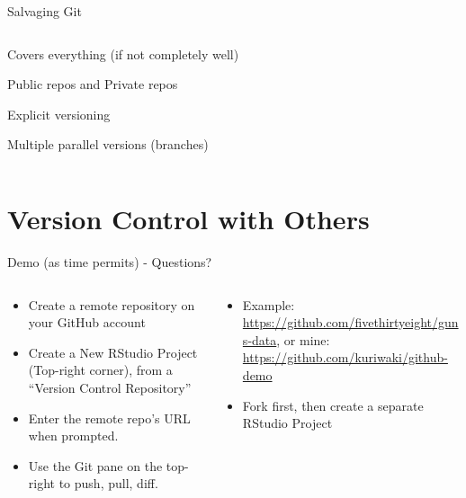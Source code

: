 \documentclass[ignorenonframetext, 10pt, aspectratio=169]{beamer}
\begin{document}
\begin{frame}{Salvaging Git}
\begin{columns}[T]
\begin{column}{0.6\textwidth}
\begin{wideitemize}
\item Covers everything (if not completely well)
\item Public repos and Private repos
\item Explicit versioning
\item Multiple parallel versions (branches) 
\end{wideitemize}
\end{column}
\end{columns}
\end{frame}

\section{Version Control with Others}


\begin{frame}{Demo (as time permits) - Questions?}
\begin{columns}[T]
\begin{column}{0.5\textwidth}
\begin{itemize}
\item Create a remote repository on your GitHub account
\item Create a New RStudio Project (Top-right corner), from a ``Version Control Repository''
\item Enter the remote repo's URL when prompted. 
\item Use the Git pane on the top-right to push, pull, diff.
\end{itemize}
\end{column}
\begin{column}{0.5\textwidth}

\begin{itemize}
\item Example: \url{https://github.com/fivethirtyeight/guns-data}, or mine: \url{https://github.com/kuriwaki/github-demo}
\item Fork first, then create a separate RStudio Project
\end{itemize}
\end{column}
\end{columns}
\end{frame}
\end{document}
